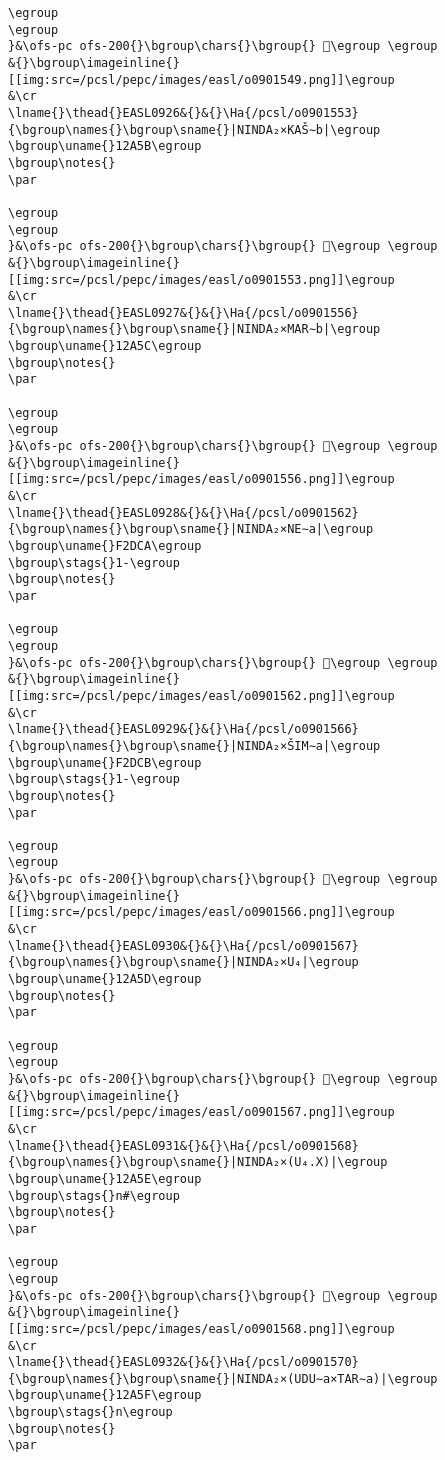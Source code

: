 \begin{verbatim}
\egroup
\egroup
}&\ofs-pc ofs-200{}\bgroup\chars{}\bgroup{} 𒩘\egroup \egroup
&{}\bgroup\imageinline{}[[img:src=/pcsl/pepc/images/easl/o0901549.png]]\egroup
&\cr
\lname{}\thead{}EASL0926&{}&{}\Ha{/pcsl/o0901553}{\bgroup\names{}\bgroup\sname{}|NINDA₂×KAŠ∼b|\egroup
\bgroup\uname{}12A5B\egroup
\bgroup\notes{}
\par 

\egroup
\egroup
}&\ofs-pc ofs-200{}\bgroup\chars{}\bgroup{} 𒩛\egroup \egroup
&{}\bgroup\imageinline{}[[img:src=/pcsl/pepc/images/easl/o0901553.png]]\egroup
&\cr
\lname{}\thead{}EASL0927&{}&{}\Ha{/pcsl/o0901556}{\bgroup\names{}\bgroup\sname{}|NINDA₂×MAR∼b|\egroup
\bgroup\uname{}12A5C\egroup
\bgroup\notes{}
\par 

\egroup
\egroup
}&\ofs-pc ofs-200{}\bgroup\chars{}\bgroup{} 𒩜\egroup \egroup
&{}\bgroup\imageinline{}[[img:src=/pcsl/pepc/images/easl/o0901556.png]]\egroup
&\cr
\lname{}\thead{}EASL0928&{}&{}\Ha{/pcsl/o0901562}{\bgroup\names{}\bgroup\sname{}|NINDA₂×NE∼a|\egroup
\bgroup\uname{}F2DCA\egroup
\bgroup\stags{}1-\egroup
\bgroup\notes{}
\par 

\egroup
\egroup
}&\ofs-pc ofs-200{}\bgroup\chars{}\bgroup{} 󲷊\egroup \egroup
&{}\bgroup\imageinline{}[[img:src=/pcsl/pepc/images/easl/o0901562.png]]\egroup
&\cr
\lname{}\thead{}EASL0929&{}&{}\Ha{/pcsl/o0901566}{\bgroup\names{}\bgroup\sname{}|NINDA₂×ŠIM∼a|\egroup
\bgroup\uname{}F2DCB\egroup
\bgroup\stags{}1-\egroup
\bgroup\notes{}
\par 

\egroup
\egroup
}&\ofs-pc ofs-200{}\bgroup\chars{}\bgroup{} 󲷋\egroup \egroup
&{}\bgroup\imageinline{}[[img:src=/pcsl/pepc/images/easl/o0901566.png]]\egroup
&\cr
\lname{}\thead{}EASL0930&{}&{}\Ha{/pcsl/o0901567}{\bgroup\names{}\bgroup\sname{}|NINDA₂×U₄|\egroup
\bgroup\uname{}12A5D\egroup
\bgroup\notes{}
\par 

\egroup
\egroup
}&\ofs-pc ofs-200{}\bgroup\chars{}\bgroup{} 𒩝\egroup \egroup
&{}\bgroup\imageinline{}[[img:src=/pcsl/pepc/images/easl/o0901567.png]]\egroup
&\cr
\lname{}\thead{}EASL0931&{}&{}\Ha{/pcsl/o0901568}{\bgroup\names{}\bgroup\sname{}|NINDA₂×(U₄.X)|\egroup
\bgroup\uname{}12A5E\egroup
\bgroup\stags{}n#\egroup
\bgroup\notes{}
\par 

\egroup
\egroup
}&\ofs-pc ofs-200{}\bgroup\chars{}\bgroup{} 𒩞\egroup \egroup
&{}\bgroup\imageinline{}[[img:src=/pcsl/pepc/images/easl/o0901568.png]]\egroup
&\cr
\lname{}\thead{}EASL0932&{}&{}\Ha{/pcsl/o0901570}{\bgroup\names{}\bgroup\sname{}|NINDA₂×(UDU∼a×TAR∼a)|\egroup
\bgroup\uname{}12A5F\egroup
\bgroup\stags{}n\egroup
\bgroup\notes{}
\par 


\end{verbatim}
